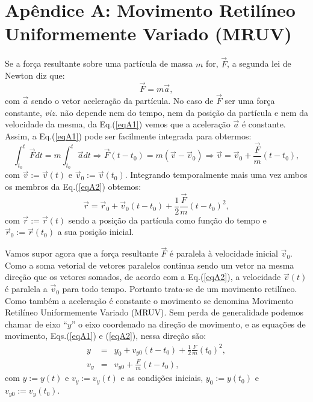 \documentclass[12pt]{article}
\newcommand{\beq}{\begin{equation}}
\newcommand{\eeq}{\end{equation}}
\newcommand{\bea}{\begin{eqnarray}}
\newcommand{\eea}{\end{eqnarray}}
\begin{document}
\clearpage

\appendix
\section{Apêndice A: Movimento Retilíneo Uniformemente Variado (MRUV)}
\label{ApendiceA}
\indent

Se a força resultante sobre uma partícula de massa $m$ for, $\vec{F}$, a  segunda lei de Newton diz que:
\beq
\label{eqA1}
\vec{F}=m\vec{a},
\eeq
com $\vec{a}$ sendo o vetor aceleração da partícula. No caso de $\vec{F}$ ser uma força constante,
{\it viz.} não depende nem do tempo, nem da posição da partícula e nem da velocidade da mesma, da Eq.(\ref{eqA1}) vemos que 
a aceleração $\vec{a}$ é constante. Assim, a Eq.(\ref{eqA1}) pode ser facilmente integrada para obtermos:
\beq
\label{eqA2}
\int_{t_0}^{t}\vec{F}dt=m\int_{t_0}^{t} \vec{a}dt\Longrightarrow \vec{F}(t-t_0)=m(\vec{v}-\vec{v}_0)
\Longrightarrow \vec{v}=\vec{v}_0+\frac{\vec{F}}{m} (t-t_0),
\eeq
com $\vec{v}:=\vec{v}(t)$ e $\vec{v}_0:=\vec{v}(t_0)$.
Integrando temporalmente mais uma vez ambos os membros da Eq.(\ref{eqA2}) obtemos:
\beq
\vec{r}=\vec{r}_0+\vec{v}_0(t-t_0)+\frac{1}{2}\frac{\vec{F}}{m}(t-t_0)^2,
\eeq
com $\vec{r}:=\vec{r}(t)$ sendo a posição da partícula como função do tempo e 
$\vec{r}_0:=\vec{r}(t_0)$ a sua posição inicial.
\par
Vamos supor agora que a força resultante 
$\vec{F}$ é paralela à velocidade inicial $\vec{v}_0$. Como a soma vetorial de vetores paralelos 
continua sendo um vetor na mesma direção que os vetores somados, de acordo com a Eq.(\ref{eqA2}), a velocidade $\vec{v}(t)$ é paralela a $\vec{v}_0$ para todo tempo. Portanto trata-se 
de um movimento retilíneo. Como também a aceleração é constante o movimento se denomina 
Movimento Retilíneo Uniformemente Variado (MRUV). Sem perda de generalidade podemos 
chamar de eixo ``$y$'' o eixo coordenado na direção de movimento,  e as equações de movimento,  Eqs.(\ref{eqA1}) e (\ref{eqA2}), nessa direção são:
\bea
y&=&y_0+v_{y0}(t-t_0) +\frac{1}{2} \frac{F}{m}(t_0)^2,\\
v_y&=&v_{y0}+\frac{F}{m}(t-t_0),
\eea 
com $y:=y(t)$ e $v_y:=v_y(t)$ e as condições iniciais, $y_0:=y(t_0)$ e $v_{y0}:=v_y(t_0)$.

\clearpage
\end{document}

